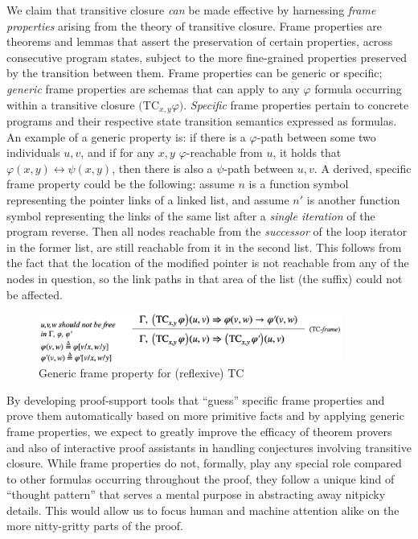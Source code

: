 
We claim that transitive closure \emph{can} be made effective by harnessing
\emph{frame properties} arising from the theory of transitive closure.
Frame properties are theorems and lemmas that assert the preservation of
certain properties, across consecutive program states, subject to the more
fine-grained properties preserved by the transition between them.
Frame properties can be generic or specific; \emph{generic} frame properties are
schemas that can apply to any $\varphi$ formula occurring within a transitive
closure $\big(\mathrm{TC}_{x,y}\varphi\big)$.
\emph{Specific} frame properties pertain to concrete programs and their respective
state transition semantics expressed as formulas.
An example of a generic property is: if there is a $\varphi$-path between some
two individuals $u, v$, and if for any $x,y$ $\varphi$-reachable from $u$, it
holds that $\varphi(x,y) \leftrightarrow \psi(x,y)$, then there is also a
$\psi$-path between $u, v$.
A derived, specific frame property could be the following: assume $n$ is a
function symbol representing the pointer links of a linked list, and assume
$n'$ is another function symbol representing the links of the same list after
a \emph{single iteration} of the program \textsf{reverse}.
Then all nodes reachable from the \emph{successor} of the loop iterator in the
former list, are still reachable from it in the second list.
This follows from the fact that the location of the modified pointer is not
reachable from any of the nodes in question, so the link paths in that area of
the list (the suffix) could not be affected.


\begin{figure}
\centering
\includegraphics[width=10cm]{img/tc-frame-gen.pdf}
\caption{Generic frame property for (reflexive) TC}
\end{figure}

By developing proof-support tools that ``guess'' specific frame properties
and prove them automatically based on more primitive facts and by applying
generic frame properties, we expect to greatly improve the efficacy of theorem
provers and also of interactive proof assistants in handling conjectures
involving transitive closure.
While frame properties do not, formally, play any special role compared to
other formulas occurring throughout the proof, they follow a unique kind of
``thought pattern'' that serves a mental purpose in abstracting away nitpicky
details.
This would allow us to focus human and machine attention alike on the more
nitty-gritty parts of the proof.

